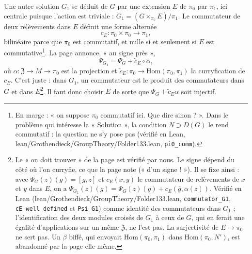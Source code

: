 \documentclass[11pt,a4paper]{article}
\begin{document}
Une autre solution $G_1$ se déduit de $G$ par une extension $E$ de $\pi_0$
par $\pi_1$, ici centrale puisque l'action est triviale :
$G_1 = (G \times_{\pi_0} E)/\pi_1$. Le commutateur de deux relèvements dans
$E$ définit une forme alternée
\[
c_E \colon \pi_0 \times \pi_0 \longrightarrow \pi_1,
\]
bilinéaire parce que $\pi_0$ est commutatif, et nulle si et seulement si
$E$ est commutative\footnote{En marge : « on suppose $\pi_0$ commutatif ici.
Que dire sinon ? ». Dans le problème qui intéresse la « Solution », la
condition $N \supset D(G)$ le rend commutatif : la question ne s'y pose
pas (vérifié en Lean, lean/Grothendieck/GroupTheory/Folder133.lean,
\texttt{pi0\_comm}).}. La page annonce, « au signe près »,
\[
\Psi_{G_1} = \Psi_G + \tilde{c}_E \circ \alpha,
\]
où $\alpha \colon \mathfrak{Z} \to M \to \pi_0$ est la projection et
$\tilde{c}_E \colon \pi_0 \to \mathrm{Hom}(\pi_0, \pi_1)$ la curryfication
de $c_E$. C'est juste : dans $G_1$, un commutateur est le produit des
commutateurs dans $G$ et dans $E$\footnote{Le « on doit trouver » de la
page est vérifié par nous. Le signe dépend du côté où l'on curryfie, ce que
la page note (« d'un signe ! »). Il se fixe ainsi : avec
$\Psi_G(z)(g) = [g, z]$ et $c_E(x, y)$ le commutateur de relèvements de $x$ et
$y$ dans $E$, on a $\Psi_{G_1}(z)(g) = \Psi_G(z)(g) + c_E(\bar{g}, \alpha(z))$.
Vérifié en Lean (lean/Grothendieck/GroupTheory/Folder133.lean, \texttt{commutator\_G1},
\texttt{cE\_well\_defined} et \texttt{Psi\_G1}) comme identité des commutateurs
dans $G_1$ ; l'identification des deux modules croisés de $G_1$ à ceux de $G$,
qui en ferait une égalité d'applications sur un même $\mathfrak{Z}$, ne l'est
pas. La surjectivité de $E \to \pi_0$ ne sert pas. Un $\beta$ biffé, qui envoyait
$\mathrm{Hom}(\pi_0, \pi_1)$ dans $\mathrm{Hom}(\pi_0, N')$, est abandonné
par la page elle-même.}. Il faut donc choisir $E$ de sorte que
$\Psi_G + \tilde{c}_E \alpha$ soit injectif.
\end{document}
